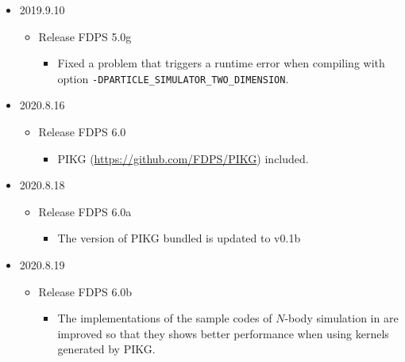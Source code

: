 \begin{itemize}
  \item 2019.9.10
    \begin{itemize}
    \item Release FDPS 5.0g
       \begin{itemize}
          \item Fixed a problem that triggers a runtime error when compiling with option \texttt{-DPARTICLE\_SIMULATOR\_TWO\_DIMENSION}.
       \end{itemize}
    \end{itemize}

  \item 2020.8.16
    \begin{itemize}
    \item Release FDPS 6.0
       \begin{itemize}
          \item PIKG (\url{https://github.com/FDPS/PIKG}) included.
       \end{itemize}
    \end{itemize}
    
  \item 2020.8.18
    \begin{itemize}
    \item Release FDPS 6.0a
       \begin{itemize}
          \item The version of PIKG bundled is updated to v0.1b
       \end{itemize}
    \end{itemize}

  \item 2020.8.19
    \begin{itemize}
    \item Release FDPS 6.0b
       \begin{itemize}
          \item The implementations of the sample codes of $N$-body simulation in  are improved so that they shows better performance when using kernels generated by PIKG.
       \end{itemize}
    \end{itemize}

\end{itemize}
